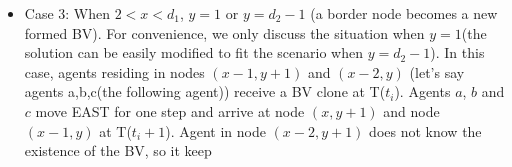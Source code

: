 \begin{itemize}
\item Case 3: When $2<x<d_1$, $y=1$ or $y=d_2-1$ (a border node becomes a new formed BV). For convenience, we only discuss the situation when $y=1$(the solution can be easily modified to fit the scenario when $y=d_2-1$). In this case, agents residing in nodes $(x-1, y+1)$ and $(x-2, y)$ (let's say agents a,b,c(the following agent)) receive a BV clone at T($t_i$). Agents $a$, $b$ and $c$ move EAST for one step and arrive at node $(x, y+1)$ and node $(x-1, y)$ at T($t_i+1$). Agent in node $(x-2, y+1)$ does not know the existence of the BV, so it keep 
\begin{figure} [H]
  \centering 
    \hspace{1in} 

\end{figure}
\end{itemize}

